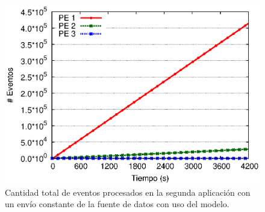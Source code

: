 \begin{figure}[!ht]
\centering
    \includegraphics[scale=0.7]{images/exp/app2/uniform/sm/eventCount.eps}
    \caption{Cantidad total de eventos procesados en la segunda aplicaci\'on con un env\'io constante de la fuente de datos con uso del modelo.}
    \label{fig:app2-uniform-eventCount-sm}
\end{figure}


